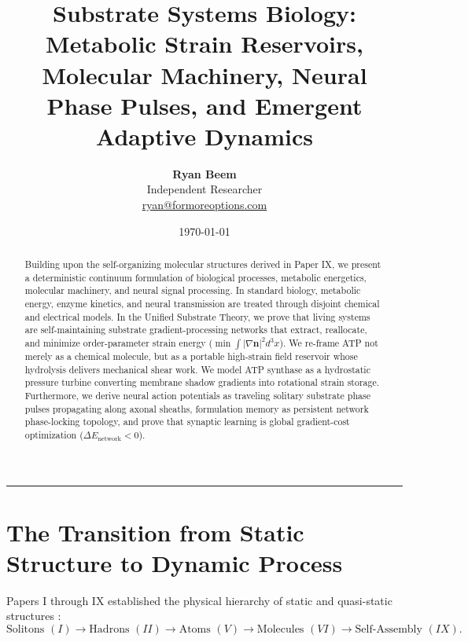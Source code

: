 \documentclass[11pt,a4paper]{article}
\title{\Large\bfseries Substrate Systems Biology: Metabolic Strain Reservoirs, Molecular Machinery, Neural Phase Pulses, and Emergent Adaptive Dynamics}
\author{
	\textbf{Ryan Beem}\\[0.5em]
	\small Independent Researcher \\
	\small \href{mailto:ryan@formoreoptions.com}{ryan@formoreoptions.com}
}
\date{\today}
\begin{document}
	
	\maketitle
	
	\begin{abstract}
		Building upon the self-organizing molecular structures derived in Paper IX, we present a deterministic continuum formulation of biological processes, metabolic energetics, molecular machinery, and neural signal processing. In standard biology, metabolic energy, enzyme kinetics, and neural transmission are treated through disjoint chemical and electrical models. In the Unified Substrate Theory, we prove that living systems are self-maintaining substrate gradient-processing networks that extract, reallocate, and minimize order-parameter strain energy ($\min \int |\nabla \mathbf{n}|^2 d^3x$). We re-frame ATP not merely as a chemical molecule, but as a portable high-strain field reservoir whose hydrolysis delivers mechanical shear work. We model ATP synthase as a hydrostatic pressure turbine converting membrane shadow gradients into rotational strain storage. Furthermore, we derive neural action potentials as traveling solitary substrate phase pulses propagating along axonal sheaths, formulation memory as persistent network phase-locking topology, and prove that synaptic learning is global gradient-cost optimization ($\Delta E_{\text{network}} < 0$).
	\end{abstract}
	
	\vspace{1em}
	\hrule
	\vspace{1.5em}
	
	\section{The Transition from Static Structure to Dynamic Process}
	\label{sec:intro_process}
	
	Papers I through IX established the physical hierarchy of static and quasi-static structures \cite{PaperI, PaperII, PaperIII, PaperIV, PaperV, PaperVI, PaperVII, PaperVIII, PaperIX}:
	\begin{equation}
		\text{Solitons } (I) \longrightarrow \text{Hadrons } (II) \longrightarrow \text{Atoms } (V) \longrightarrow \text{Molecules } (VI) \longrightarrow \text{Self-Assembly } (IX).
	\end{equation}
	
\end{document}
